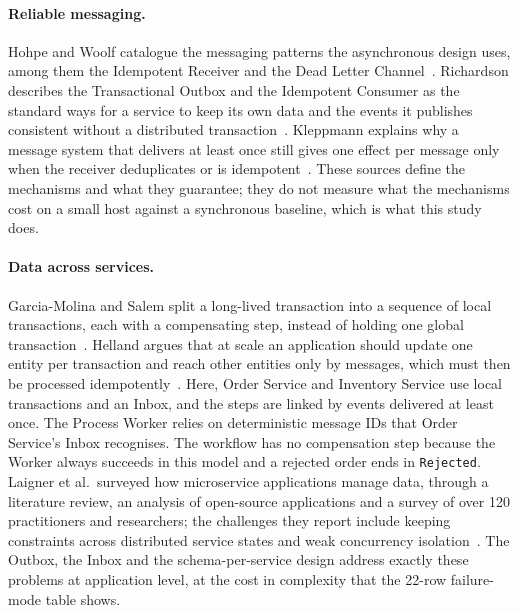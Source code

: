 \documentclass[a4paper]{report}
\begin{document}
\paragraph{Reliable messaging.} Hohpe and Woolf catalogue the messaging
patterns the asynchronous design uses, among them the Idempotent Receiver and
the Dead Letter Channel~\cite{hohpe-eip,eip-idempotent,eip-dead-letter}.
Richardson describes the Transactional Outbox and the Idempotent Consumer as the
standard ways for a service to keep its own data and the events it publishes
consistent without a distributed transaction~\cite{richardson-patterns,
richardson-outbox,richardson-idempotent}. Kleppmann explains why a message
system that delivers at least once still gives one effect per message only when
the receiver deduplicates or is idempotent~\cite{kleppmann-ddia}. These sources
define the mechanisms and what they guarantee; they do not measure what the
mechanisms cost on a small host against a synchronous baseline, which is what
this study does.

\paragraph{Data across services.} Garcia-Molina and Salem split a long-lived
transaction into a sequence of local transactions, each with a compensating
step, instead of holding one global transaction~\cite{garcia-molina-sagas}.
Helland argues that at scale an application should update one entity per
transaction and reach other entities only by messages, which must then be
processed idempotently~\cite{helland-beyond}. Here, Order Service and Inventory
Service use local transactions and an Inbox, and the steps are linked by
events delivered at least once. The Process Worker relies on deterministic
message IDs that Order Service's Inbox recognises. The workflow has no
compensation step because the Worker always succeeds in this model and a
rejected order ends in \texttt{Rejected}. Laigner et al.\ surveyed how microservice
applications manage data, through a literature review, an analysis of
open-source applications and a survey of over 120 practitioners and
researchers; the challenges they report include keeping constraints across
distributed service states and weak concurrency
isolation~\cite{laigner-microservices}. The Outbox, the Inbox and the
schema-per-service design address exactly these problems at application level,
at the cost in complexity that the 22-row failure-mode table shows.
\end{document}
